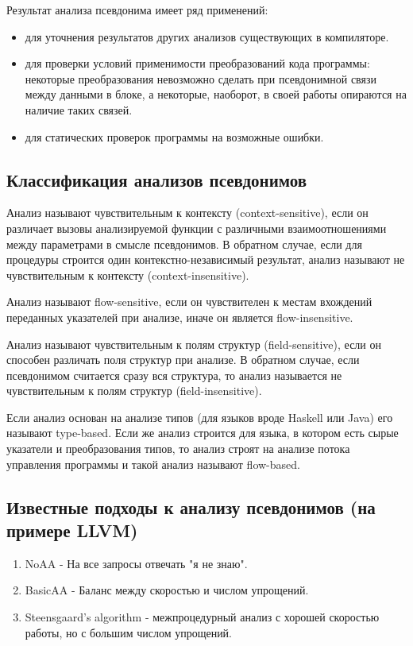 Результат анализа псевдонима имеет ряд применений:
\begin{itemize}
\item для уточнения результатов других анализов существующих в компиляторе.
\item для проверки условий применимости преобразований кода программы: некоторые преобразования невозможно сделать при псевдонимной связи между данными в блоке, а некоторые, наоборот, в своей работы опираются на наличие таких связей.
\item для статических проверок программы на возможные ошибки.
\end{itemize}

\subsection{Классификация анализов псевдонимов}

Анализ называют чувствительным к контексту (context-sensitive), если он различает вызовы анализируемой функции с различными взаимоотношениями между параметрами в смысле псевдонимов. В обратном случае, если для процедуры строится один контекстно-независимый результат, анализ называют не чувствительным к контексту (context-insensitive).

Анализ называют flow-sensitive, если он чувствителен к местам вхождений переданных указателей при анализе, иначе он является flow-insensitive.

Анализ называют чувствительным к полям структур (field-sensitive), если он способен различать поля структур при анализе. В обратном случае, если псевдонимом считается сразу вся структура, то анализ называется не чувствительным к полям структур (field-insensitive).

Если анализ основан на анализе типов (для языков вроде Haskell или Java) его называют  type-based. Если же анализ строится для языка, в котором есть сырые указатели и преобразования типов, то анализ строят на анализе потока управления программы и такой анализ называют flow-based.

\subsection{Известные подходы к анализу псевдонимов (на примере LLVM)}

\begin{enumerate}
\item NoAA - На все запросы отвечать "я не знаю".
\item BasicAA - Баланс между скоростью и числом упрощений.
\item Steensgaard’s algorithm - межпроцедурный анализ с хорошей скоростью работы, но с большим числом упрощений.
\end{enumerate}

